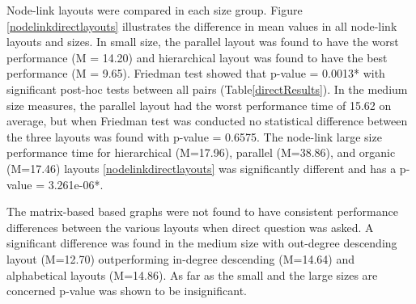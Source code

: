 \documentclass{l4proj}
\begin{document}
Node-link layouts were compared in each size group. Figure \ref{nodelinkdirectlayouts} illustrates the difference in mean values in all node-link layouts and sizes. In small size, the parallel layout was found to have the worst performance (M = 14.20) and hierarchical layout was found to have the best performance (M = 9.65). Friedman test showed that p-value = 0.0013* with significant post-hoc tests between all pairs (Table\ref{directResults}). In the medium size measures, the parallel layout had the worst performance time of 15.62 on average, but when Friedman test was conducted no statistical difference between the three layouts was found with p-value = 0.6575. The node-link large size performance time for hierarchical (M=17.96), parallel (M=38.86), and organic (M=17.46) layouts \ref{nodelinkdirectlayouts} was significantly different and has a p-value = 3.261e-06*. 

The matrix-based based graphs were not found to have consistent performance differences between the various layouts when direct question was asked. A significant difference was found in the medium size with out-degree descending layout (M=12.70) outperforming in-degree descending (M=14.64) and alphabetical layouts (M=14.86). As far as the small and the large sizes are concerned p-value was shown to be insignificant.
\end{document}
